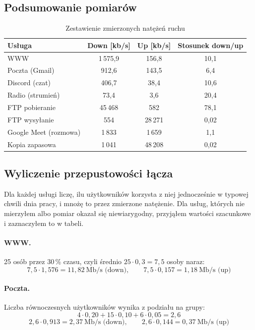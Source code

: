 \documentclass[12pt,a4paper]{article}
\begin{document}
\subsection{Podsumowanie pomiarów}

\begin{table}[H]\centering
\begin{tabular}{>{\raggedright}p{3.6cm}ccc}
\toprule
Usługa & Down [kb/s] & Up [kb/s] & Stosunek down/up \\
\midrule
WWW & 1\,575,9 & 156,8 & 10,1 \\
Poczta (Gmail) & 912,6 & 143,5 & 6,4 \\
Discord (czat) & 406,7 & 38,4 & 10,6 \\
Radio (strumień) & 73,4 & 3,6 & 20,4 \\
FTP pobieranie & 45\,468 & 582 & 78,1 \\
FTP wysyłanie & 554 & 28\,271 & 0,02 \\
Google Meet (rozmowa) & 1\,833 & 1\,659 & 1,1 \\
Kopia zapasowa & 1\,041 & 48\,208 & 0,02 \\
\bottomrule
\end{tabular}
\caption{Zestawienie zmierzonych natężeń ruchu}
\end{table}

\subsection{Wyliczenie przepustowości łącza}\label{sec:obliczenia}

Dla każdej usługi liczę, ilu użytkowników korzysta z niej jednocześnie w typowej chwili dnia pracy,
i mnożę to przez zmierzone natężenie. Dla usług, których nie mierzyłem albo pomiar okazał się
niewiarygodny, przyjąłem wartości szacunkowe i zaznaczyłem to w tabeli.

\paragraph{WWW.} 25 osób przez 30\,\% czasu, czyli średnio $25 \cdot 0{,}3 = 7{,}5$ osoby naraz:
\[
7{,}5 \cdot 1{,}576 = 11{,}82\ \text{Mb/s (down)}, \qquad 7{,}5 \cdot 0{,}157 = 1{,}18\ \text{Mb/s (up)}
\]

\paragraph{Poczta.} Liczba równoczesnych użytkowników wynika z podziału na grupy:
\[
4 \cdot 0{,}20 + 15 \cdot 0{,}10 + 6 \cdot 0{,}05 = 2{,}6
\]
\[
2{,}6 \cdot 0{,}913 = 2{,}37\ \text{Mb/s (down)}, \qquad 2{,}6 \cdot 0{,}144 = 0{,}37\ \text{Mb/s (up)}
\]
\end{document}
